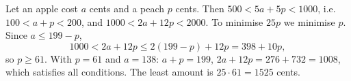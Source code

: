 Let an apple cost $a$ cents and a peach $p$ cents. Then $500<5a+5p<1000$, i.e. $100<a+p<200$, and $1000<2a+12p<2000$. To minimise $25p$ we minimise $p$. Since $a\le199-p$,
\[
1000<2a+12p\le2(199-p)+12p=398+10p,
\]
so $p\ge61$. With $p=61$ and $a=138$: $a+p=199$, $2a+12p=276+732=1008$, which satisfies all conditions. The least amount is $25\cdot61=\boxed{1525}$ cents.
